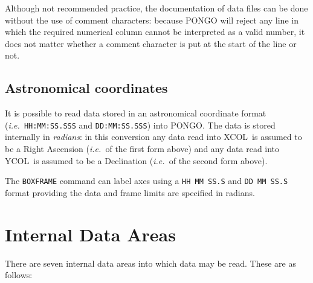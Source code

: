 \documentclass[twoside,11pt]{article}
\newcommand{\htmlref}[2]{#1}
\renewcommand{\_}{\texttt{\symbol{95}}}
\newcommand{\ie}{{\em i.e.\ }}
\newcommand{\xcol}{{\sf XCOL}}
\newcommand{\ycol}{{\sf YCOL}}
\newcommand{\cnam}[1]{{\tt #1}}
\newcommand{\iref} [1]{\htmlref{#1}{#1}}
\begin{document}
Although not recommended practice, the documentation of data files can
be done without the use of comment characters: because PONGO will
reject any line in which the required numerical column cannot be
interpreted as a valid number, it does not matter whether a comment
character is put at the start of the line or not.


\subsection{Astronomical coordinates}

It is possible to read data stored in an astronomical coordinate
format (\ie \verb+HH:MM:SS.SSS+ and \verb+DD:MM:SS.SSS+) into PONGO.
The data is stored internally in {\em radians}: in this conversion any data
read into \xcol\ is assumed to be a Right Ascension (\ie of the first
form above) and any data read into \ycol\ is assumed to be a
Declination (\ie of the second form above).

The \cnam{\iref{BOXFRAME}} command can label axes using a 
\verb+HH MM SS.S+ and \verb+DD MM SS.S+ format providing the data and frame limits
are specified in radians.

\section{Internal Data Areas}

There are seven internal data areas into which data may be read.
These are as follows:
\end{document}

